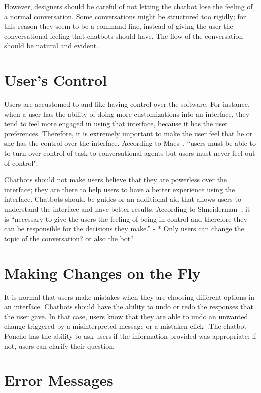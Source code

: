 \documentclass[a4paper,10pt]{article}
\begin{document}
However, designers should be careful of not letting the chatbot lose the feeling of a normal conversation. Some conversations might be structured too rigidly; for this reason they seem to be a command line, instead of giving the user the conversational feeling that chatbots should have. The flow of the conversation should be natural and evident. 

\section{User's Control}

Users are accustomed to and like having control over the software. For instance, when a user has the ability of doing more customizations into an interface, they tend to feel more engaged in using that interface, because it has the user preferences. Therefore, it is extremely important to make the user feel that he or she has the control over the interface. According to Maes~\cite{shneiderman1997direct}, ``users must be able to to turn over control of task to conversational agents but users must never feel out of control".

Chatbots should not make users believe that they are powerless over the interface; they are there to help users to have a better experience using the interface. Chatbots should be guides or an additional aid that allows users to understand the interface and have better results. According to Shneiderman~\cite{shneiderman1997direct}, it is ``necessary to give the users the feeling of being in control and therefore they can be responsible for the decisions they make.” - * Only users can change the topic of the conversation? or also the bot?

\section{Making Changes on the Fly}

It is normal that users make mistakes when they are choosing different options in an interface. Chatbots should have the ability to undo or redo the responses that the user gave. In that case, users know that they are able to undo an unwanted change triggered by a misinterpreted message or a mistaken click~\cite{HeuristicsWebPage}.The chatbot Poncho has the ability to ask users if the information provided was appropriate; if not, users can clarify their question. 

\section{Error Messages}
\end{document}
